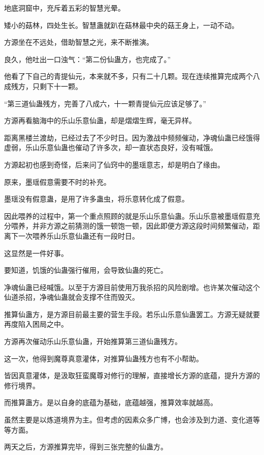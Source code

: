 
\begin{this_body}

地底洞窟中，充斥着五彩的智慧光晕。

矮小的菇林，四处生长。智慧蛊就趴在菇林最中央的菇王身上，一动不动。

方源坐在不远处，借助智慧之光，来不断推演。

良久，他吐出一口浊气：“第二份仙蛊方，也完成了。”

他看了下自己的青提仙元，本来就不多，只有二十几颗。现在连续推算完成两个八成残方，只剩下十一颗。

“第三道仙蛊残方，完善了八成六，十一颗青提仙元应该足够了。”

方源再看脑海中的乐山乐意仙蛊，却是熠熠生辉，毫无异样。

距离黑楼兰渡劫，已经过去了不少时日。因为激战中频频催动，净魂仙蛊已经饿得虚弱，乐山乐意仙蛊也催动了许多次，却一直状态良好，没有喊饿。

方源起初也感到奇怪，后来问了仙窍中的墨瑶意志，却是明白了缘由。

原来，墨瑶假意需要不时的补充。

墨瑶没有假意蛊，是用了许多蛊虫，将乐意转化成了假意。

因此喂养的过程中，第一个重点照顾的就是乐山乐意仙蛊。乐山乐意被墨瑶假意充分喂养，并非方源之前猜测的饿一顿饱一顿，因此即便方源这段时间频繁催动，距离下一次喂养乐山乐意仙蛊还有一段时日。

这显然是一件好事。

要知道，饥饿的仙蛊强行催用，会导致仙蛊的死亡。

净魂仙蛊已经喊饿。以至于方源目前使用万我杀招的风险剧增。也许某次催动这个仙道杀招，净魂仙蛊就会支撑不住而毁灭。

推算仙蛊方，是方源目前最主要的营生手段。若乐山乐意仙蛊罢工。方源无疑就要再度陷入困局之中。

方源再次催动乐山乐意仙蛊，开始推算第三道仙蛊残方。

这一次，他得到魔尊真意灌体，对推算仙蛊残方也有不小帮助。

皆因真意灌体，是汲取狂蛮魔尊对修行的理解，直接增长方源的底蕴，提升方源的修行境界。

而推算蛊方。是以自身的底蕴为基础，底蕴越强，推算效率就越高。

虽然主要是以炼道境界为主。但考虑的因素众多广博，也会涉及到力道、变化道等等方面。

两天之后，方源推算完毕，得到三张完整的仙蛊方。


\end{this_body}
